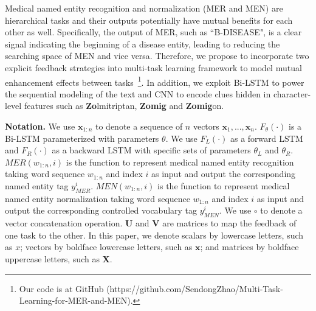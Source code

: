 Medical named entity recognition and normalization (MER and MEN) are hierarchical tasks and their outputs potentially have mutual benefits for each other as well. Specifically, the output of MER, such as ``B-DISEASE", is a clear signal indicating the beginning of a disease entity, leading to reducing the searching space of MEN and vice versa. Therefore, we propose to incorporate two explicit feedback strategies into multi-task learning framework to model mutual enhancement effects between tasks~\footnote{Our code is at GitHub (https://github.com/SendongZhao/Multi-Task-Learning-for-MER-and-MEN).}.
 In addition, we exploit Bi-LSTM to power the sequential modeling of the text and CNN to encode clues hidden in character-level features such as \textbf{Zo}lmitriptan, \textbf{Zomig} and \textbf{Zomig}on.

\textbf{Notation.} We use $\mathbf{x}_{1:n}$ to denote a sequence of $n$ vectors $\mathbf{x}_1,..., \mathbf{x}_n$. $F_{\theta}(\cdot)$ is a Bi-LSTM parameterized with parameters $\theta$. We use $F_L(\cdot)$ as a forward LSTM and $F_R(\cdot)$ as a backward LSTM with specific sets of parameters $\theta_L$ and $\theta_R$. $MER(w_{1:n},i)$ is the function to represent medical named entity recognition taking word sequence $w_{1:n}$ and index $i$ as input and output the corresponding named entity tag $y_{MER}^{i}$. $MEN(w_{1:n},i)$ is the function to represent medical named entity normalization taking word sequence $w_{1:n}$ and index $i$ as input and output the corresponding controlled vocabulary tag $y_{MEN}^{i}$.
We use $\circ$ to denote a vector concatenation operation. $\mathbf{U}$ and $\mathbf{V}$ are matrices to map the feedback of one task to the other. In this paper, we denote scalars by lowercase letters, such as $x$; vectors by boldface lowercase letters, such as $\mathbf{x}$; and matrices by boldface uppercase letters, such as $\mathbf{X}$.

